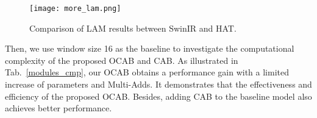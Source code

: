 \documentclass[10pt,twocolumn,letterpaper]{article}
\begin{document}
\begin{table}[!t]
\center
\begin{center}
\caption{Model complexity comparison of CAB sizes.}
\label{cab_cmp}
\end{center}
\end{table}

\begin{table}[!t]
\center
\begin{center}
\caption{Model complexity comparison of SwinIR and HAT.}
\label{method_cmp}
\vspace{-0.3cm}
\end{center}
\end{table}

\begin{figure*}[!t]
\centering
\texttt{[image: more\_lam.png]}
\vspace{-0.3cm}
\caption{Comparison of LAM results between SwinIR and HAT.}
\label{more_lam}
\vspace{-0.4cm}
\end{figure*}

Then, we use window size 16 as the baseline to investigate the computational complexity of the proposed OCAB and CAB. As illustrated in Tab.~\ref{modules_cmp}, our OCAB obtains a performance gain with a limited increase of parameters and Multi-Adds. It demonstrates that the effectiveness and efficiency of the proposed OCAB. Besides, adding CAB to the baseline model also achieves better performance. 
\end{document}
